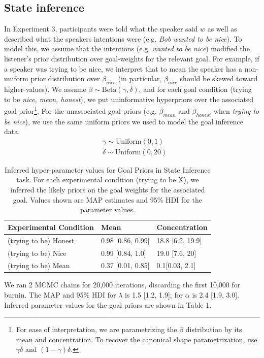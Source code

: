 \documentclass[10pt,letterpaper]{article}
\newcommand{\red}[1]{\textcolor{Red}{#1}}
\begin{document}
\subsection{State inference}

In Experiment 3, participants were told what the speaker said $w$ as well as described what the speakers intentions were (e.g. \emph{Bob wanted to be nice}). 
To model this, we assume that the intentions (e.g. \emph{wanted to be nice}) modified the listener's prior distribution over goal-weights for the relevant goal. For example, if a speaker was trying to be nice, we interpret that to mean the speaker has a non-uniform prior distribution over $\beta_{nice}$ (in particular, $\beta_{nice}$ should be skewed toward higher-values). 
We assume $\beta \sim \text{Beta}(\gamma, \delta)$, and for each goal condition (trying to be \emph{nice, mean, honest}), we put uninformative hyperpriors over the associated goal prior\footnote{For ease of interpretation, we are parametrizing the $\beta$ distribution by its mean and concentration. To recover the canonical shape parametrization, use $\gamma \delta$ and $(1-\gamma)\delta$.}.
For the unassociated goal priors (e.g. $\beta_{mean}$ and $\beta_{honest}$ when \emph{trying to be nice}), we use the same uniform priors we used to model the goal inference data.
%
\begin{eqnarray*}
& \gamma \sim  \text{Uniform}(0,1)\\
& \delta  \sim  \text{Uniform}(0, 20)
\end{eqnarray*}

\begin{table}[]
\label{my-table}
\begin{tabular}{lll}
\hline
Experimental Condition  & Mean & Concentration \\ \hline
(trying to be) Honest                        &   0.98 [0.86, 0.99]   & 18.8 [6.2, 19.9] \\
(trying to be) Nice                          & 0.99 [0.84, 1.0] & 19.0 [7.6, 20] \\
(trying to be) Mean                          &0.37 [0.01, 0.85] & 0.1[0.03, 2.1] \\ \hline
\end{tabular}
\caption{Inferred hyper-parameter values for Goal Priors in State Inference task.
For each experimental condition (trying to be X), we inferred the likely priors on the goal weights for the associated goal.
Values shown are MAP estimates and 95\% HDI for the parameter values.}
\end{table}
We ran 2 MCMC chains for 20,000 iterations, discarding the first 10,000 for burnin.
The MAP and 95\% HDI for $\lambda$ is 1.5 [1.2, 1.9]; for $\alpha$ is 2.4 [1.9, 3.0].%
Inferred parameter values for the goal priors are shown in Table 1.
\end{document}
